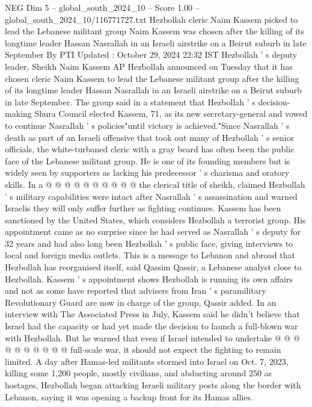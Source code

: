 \begin{textsample}{NEG Dim 5 – global\_south\_2024\_10 – Score 1.00 – global\_south\_2024\_10/116771727.txt}  \label{ex:f5_neg_110}
Hezbollah cleric Naim Kassem picked to lead the Lebanese militant group Naim Kassem was chosen after the killing of its longtime leader Hassan Nasrallah in an Israeli airstrike on a Beirut suburb in late September By PTI Updated : October 29, 2024 22:32 IST Hezbollah ' s deputy leader, Sheikh Naim Kassem AP Hezbollah announced on Tuesday that it has chosen cleric Naim Kassem to lead the Lebanese militant group after the killing of its longtime leader Hassan Nasrallah in an Israeli airstrike on a Beirut suburb in late September.
The group said in a statement that Hezbollah ' s decision-making Shura Council elected Kassem, 71, as its new secretary-general and vowed to continue Nasrallah ' s policies"until victory is achieved."Since Nasrallah ' s death as part of an Israeli offensive that took out many of Hezbollah ' s senior officials, the white-turbaned cleric with a gray beard has often been the public face of the Lebanese militant group.
He is one of its founding members but is widely seen by supporters as lacking his predecessor ' s charisma and oratory skills.
In a @ @ @ @ @ @ @ @ @ @ the clerical title of sheikh, claimed Hezbollah ' s military capabilities were intact after Nasrallah ' s assassination and warned Israelis they will only suffer further as fighting continues.
Kassem has been sanctioned by the United States, which considers Hezbollah a terrorist group.
His appointment came as no surprise since he had served as Nasrallah ' s deputy for 32 years and had also long been Hezbollah ' s public face, giving interviews to local and foreign media outlets.
This is a message to Lebanon and abroad that Hezbollah has reorganised itself, said Qassim Qassir, a Lebanese analyst close to Hezbollah.
Kassem ' s appointment shows Hezbollah is running its own affairs and not as some have reported that advisers from Iran ' s paramilitary Revolutionary Guard are now in charge of the group, Qassir added.
In an interview with The Associated Press in July, Kassem said he didn't believe that Israel had the capacity or had yet made the decision to launch a full-blown war with Hezbollah.
But he warned that even if Israel intended to undertake @ @ @ @ @ @ @ @ @ @ full-scale war, it should not expect the fighting to remain limited.
A day after Hamas-led militants stormed into Israel on Oct. 7, 2023, killing some 1,200 people, mostly civilians, and abducting around 250 as hostages, Hezbollah began attacking Israeli military posts along the border with Lebanon, saying it was opening a backup front for its Hamas allies.

\end{textsample}
